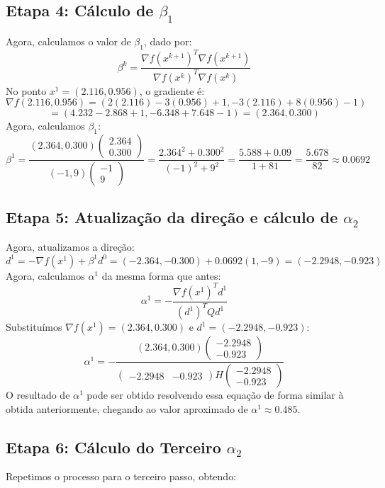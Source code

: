 \documentclass[a4paper, 12pt]{article}
\begin{document}
\subsection{Etapa 4: Cálculo de \( \beta_1 \)}
Agora, calculamos o valor de \( \beta_1 \), dado por:
\[
\beta^k = \frac{\nabla f(x^{k+1})^T \nabla f(x^{k+1})}{\nabla f(x^k)^T \nabla f(x^k)}
\]
No ponto \( x^1 = (2.116, 0.956) \), o gradiente é:
\[
\nabla f(2.116, 0.956) = (2(2.116) - 3(0.956) + 1, -3(2.116) + 8(0.956) - 1)
\]
\[
= (4.232 - 2.868 + 1, -6.348 + 7.648 - 1) = (2.364, 0.300)
\]
Agora, calculamos \( \beta_1 \):
\[
\beta^1 = \frac{(2.364, 0.300) \begin{pmatrix} 2.364 \\ 0.300 \end{pmatrix}}{(-1, 9) \begin{pmatrix} -1 \\ 9 \end{pmatrix}} = \frac{2.364^2 + 0.300^2}{(-1)^2 + 9^2} = \frac{5.588 + 0.09}{1 + 81} = \frac{5.678}{82} \approx 0.0692
\]

\subsection{Etapa 5: Atualização da direção e cálculo de \( \alpha_2 \)}
Agora, atualizamos a direção:
\[
d^1 = -\nabla f(x^1) + \beta^1 d^0 = (-2.364, -0.300) + 0.0692(1, -9) = (-2.2948, -0.923)
\]
Agora, calculamos \( \alpha^1 \) da mesma forma que antes:
\[
\alpha^1 = -\frac{\nabla f(x^1)^T d^1}{(d^1)^T Q d^1}
\]
Substituímos \( \nabla f(x^1) = (2.364, 0.300) \) e \( d^1 = (-2.2948, -0.923) \):
\[
\alpha^1 = -\frac{(2.364, 0.300) \begin{pmatrix} -2.2948 \\ -0.923 \end{pmatrix}}{\begin{pmatrix} -2.2948 & -0.923 \end{pmatrix} H \begin{pmatrix} -2.2948 \\ -0.923 \end{pmatrix}}
\]
O resultado de \( \alpha^1 \) pode ser obtido resolvendo essa equação de forma similar à obtida anteriormente, chegando ao valor aproximado de \( \alpha^1 \approx 0.485 \).

\subsection{Etapa 6: Cálculo do Terceiro \( \alpha_2 \)}
Repetimos o processo para o terceiro passo, obtendo:
\end{document}

